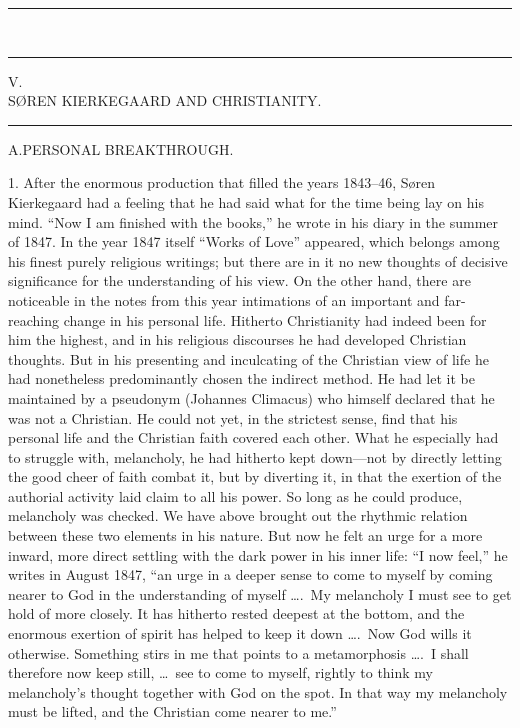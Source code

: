 \documentclass[12pt,a4paper]{book}
\newcommand{\opage}[1]{\marginnote{\footnotesize\textit{[#1]}}}
\begin{document}
\begin{center}\rule{2cm}{0.4pt}\\[-8pt]\rule{2cm}{0.4pt}\end{center}
\clearpage

\opage{127}\begin{center}V.\\[4pt] SØREN KIERKEGAARD AND CHRISTIANITY.\\[4pt]\rule{1.5cm}{0.4pt}\end{center}

\begin{center}A.\quad PERSONAL BREAKTHROUGH.\end{center}

1. After the enormous production that filled the years 1843--46, Søren
Kierkegaard had a feeling that he had said what for the time being lay
on his mind. ``Now I am finished with the books,'' he wrote in his diary
in the summer of 1847. In the year 1847 itself ``Works of Love''
appeared, which belongs among his finest purely religious writings; but
there are in it no new thoughts of decisive significance for the
understanding of his view. On the other hand, there are noticeable in
the notes from this year intimations of an important and far-reaching
change in his personal life. Hitherto Christianity had indeed been for
him the highest, and in his religious discourses he had developed
Christian thoughts. But in his presenting and inculcating of the
Christian view of life he had nonetheless predominantly chosen the
indirect method. He had let it be maintained by a pseudonym (Johannes
Climacus) who himself declared that he was not a Christian. He could not
yet, in the strictest sense, find that his personal life and the
Christian faith covered each other. What he especially had to struggle
with, melancholy, he had
\opage{128}hitherto kept down---not by directly letting the good cheer of
faith combat it, but by diverting it, in that the exertion of the
authorial activity laid claim to all his power. So long as he could
produce, melancholy was checked. We have above brought out the rhythmic
relation between these two elements in his nature. But now he felt an
urge for a more inward, more direct settling with the dark power in his
inner life: ``I now feel,'' he writes in August 1847, ``an urge in a
deeper sense to come to myself by coming nearer to God in the
understanding of myself \dots.\ My melancholy I must see to get hold of
more closely. It has hitherto rested deepest at the bottom, and the
enormous exertion of spirit has helped to keep it down \dots.\ Now God
wills it otherwise. Something stirs in me that points to a metamorphosis
\dots.\ I shall therefore now keep still, \dots\ see to come to myself,
rightly to think my melancholy's thought together with God on the spot.
In that way my melancholy must be lifted, and the Christian come nearer
to me.''
\end{document}

